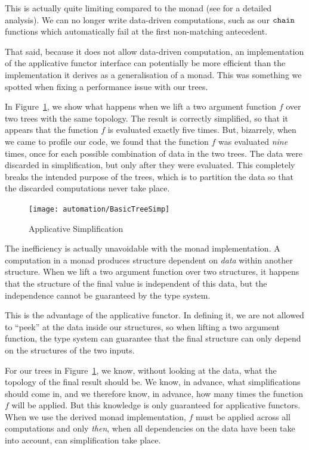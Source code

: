 This is actually quite limiting compared to the monad (see \cite{IdiomsArrowsMonads} for a detailed analysis). We can no longer write data-driven computations, such as our $\texttt{chain}$ functions which automatically fail at the first non-matching antecedent.

That said, because it does not allow data-driven computation, an implementation of the applicative functor interface can potentially be more efficient than the implementation it derives as a generalisation of a monad. This was something we spotted when fixing a performance issue with our trees.

In Figure~\ref{fig:ApplicativeSimp}, we show what happens when we lift a two argument function $f$ over two trees with the same topology. The result is correctly simplified, so that it appears that the function $f$ is evaluated exactly five times. But, bizarrely, when we came to profile our code, we found that the function $f$ was evaluated \emph{nine} times, once for each possible combination of data in the two trees. The data were discarded in simplification, but only after they were evaluated. This completely breaks the intended purpose of the trees, which is to partition the data so that the discarded computations never take place.

\begin{figure}
\centering\texttt{[image: automation/BasicTreeSimp]}
\caption{Applicative Simplification}
\label{fig:ApplicativeSimp}
\end{figure}

The inefficiency is actually unavoidable with the monad implementation. A computation in a monad produces structure dependent on \emph{data} within another structure. When we lift a two argument function over two structures, it happens that the structure of the final value is independent of this data, but the independence cannot be guaranteed by the type system.

This is the advantage of the applicative functor. In defining it, we are not allowed to ``peek'' at the data inside our structures, so when lifting a two argument function, the type system can guarantee that the final structure can only depend on the structures of the two inputs. 

For our trees in Figure~\ref{fig:ApplicativeSimp}, we know, without looking at the data, what the topology of the final result should be. We know, in advance, what simplifications should come in, and we therefore know, in advance, how many times the function $f$ will be applied. But this knowledge is only guaranteed for applicative functors. When we use the derived monad implementation, $f$ must be applied across all computations and only \emph{then}, when all dependencies on the data have been take into account,  can simplification take place.

